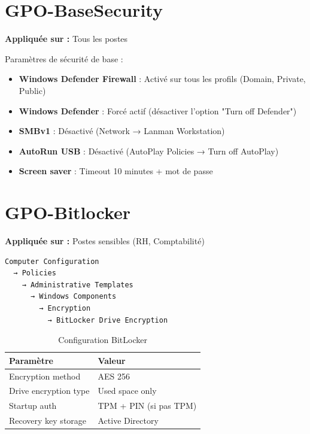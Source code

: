 \section{GPO-BaseSecurity}

\textbf{Appliquée sur :} Tous les postes

Paramètres de sécurité de base :

\begin{itemize}
    \item \textbf{Windows Defender Firewall} : Activé sur tous les profils (Domain, Private, Public)
    \item \textbf{Windows Defender} : Forcé actif (désactiver l'option "Turn off Defender")
    \item \textbf{SMBv1} : Désactivé (Network → Lanman Workstation)
    \item \textbf{AutoRun USB} : Désactivé (AutoPlay Policies → Turn off AutoPlay)
    \item \textbf{Screen saver} : Timeout 10 minutes + mot de passe
\end{itemize}

\section{GPO-Bitlocker}

\textbf{Appliquée sur :} Postes sensibles (RH, Comptabilité)

\begin{lstlisting}
Computer Configuration
  → Policies
    → Administrative Templates
      → Windows Components
        → Encryption
          → BitLocker Drive Encryption
\end{lstlisting}

\begin{table}[H]
    \centering
    \begin{tabularx}{\textwidth}{|p{3cm}|p{4cm}|}
        \hline
        \textbf{Paramètre} & \textbf{Valeur} \\
        \hline
        Encryption method & AES 256 \\
        \hline
        Drive encryption type & Used space only \\
        \hline
        Startup auth & TPM + PIN (si pas TPM) \\
        \hline
        Recovery key storage & Active Directory \\
        \hline
    \end{tabularx}
    \caption{Configuration BitLocker}
    \label{tab:bitlocker}
\end{table}

